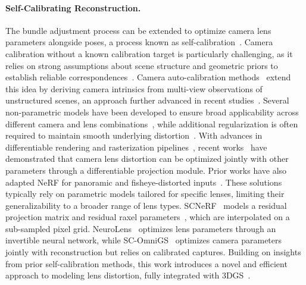 \paragraph{Self-Calibrating Reconstruction.}
The bundle adjustment process can be extended to optimize camera lens parameters alongside poses, a process known as self-calibration~\cite{zhang1999flexible,pollefeys1999self,devernay2001straight,hartley2003multiple}. Camera calibration without a known calibration target is particularly challenging, as it relies on strong assumptions about scene structure and geometric priors to establish reliable correspondences~\cite{barreto2005geometric,carroll2009optimizing,aleman2014automatic}. Camera auto-calibration methods~\cite{zhang1999flexible,pollefeys1999self,devernay2001straight} extend this idea by deriving camera intrinsics from multi-view observations of unstructured scenes, an approach further advanced in recent studies~\cite{fang2022self,engel2016photometrically,ha2016high,deng2024physics}.
Several non-parametric models have been developed to ensure broad applicability across different camera and lens combinations~\cite{grossberg2001general,camposeco2015non,hartley2007parameter,li2006plane}, while additional regularization is often required to maintain smooth underlying distortion~\cite{pan2022camera}. With advances in differentiable rendering and rasterization pipelines~\cite{kopanas2021point,yifan2019differentiable}, recent works~\cite{ruckert2022adop,xian2023neural,jeong2021self} have demonstrated that camera lens distortion can be optimized jointly with other parameters through a differentiable projection module.
Prior works have also adapted NeRF for panoramic and fisheye-distorted inputs~\cite{gu2022omni,huang2022360roam,xu2023vr,kulkarni2023360fusionnerf}. These solutions typically rely on parametric models tailored for specific lenses, limiting their generalizability to a broader range of lens types. SCNeRF~\cite{jeong2021self} models a residual projection matrix and residual raxel parameters~\cite{grossberg2005raxel}, which are interpolated on a sub-sampled pixel grid. NeuroLens~\cite{xian2023neural} optimizes lens parameters through an invertible neural network, while SC-OmniGS~\cite{huang2025sc} optimizes camera parameters jointly with reconstruction but relies on calibrated captures.
Building on insights from prior self-calibration methods, this work introduces a novel and efficient approach to modeling lens distortion, fully integrated with 3DGS~\cite{kerbl20233d}.